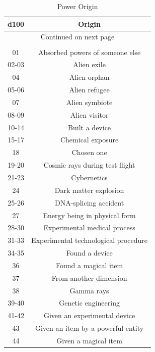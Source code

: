 \begin{longtable}{| c | c |}
\caption{Power Origin} 
\label{tab:Power Origin} \\
\hline
\textbf{d100} & \textbf{Origin}  \\
\hline
\endhead %

\hline
\multicolumn{2}{|c|}{Continued on next page} \\ \hline
\endfoot %

\hline
\multicolumn{2}{|c|}{End of Table} \\ \hline
\endlastfoot %

01 & Absorbed powers of someone else \\ \hline
02-03 & Alien exile \\ \hline
04 & Alien orphan \\ \hline
05-06 &Alien refugee \\ \hline
07 & Alien symbiote \\ \hline
08-09 & Alien visitor \\ \hline
10-14 & Built a device \\ \hline
15-17 & Chemical exposure \\ \hline
18 & Chosen one \\ \hline
19-20 & Cosmic rays during test flight \\ \hline
21-23 & Cybernetics \\ \hline
24 & Dark matter explosion \\ \hline
25-26 & DNA-splicing accident \\ \hline
27 & Energy being in physical form \\ \hline
28-30 & Experimental medical process \\ \hline
31-33 & Experimental technological procedure \\ \hline
34-35 & Found a device \\ \hline
36 & Found a magical item \\ \hline
37 & From another dimension \\ \hline
38 & Gamma rays \\ \hline
39-40 & Genetic engineering \\ \hline
41-42 & Given an experimental device \\ \hline
43 & Given an item by a powerful entity \\ \hline
44 & Given a magical item \\ \hline

\end{longtable}
